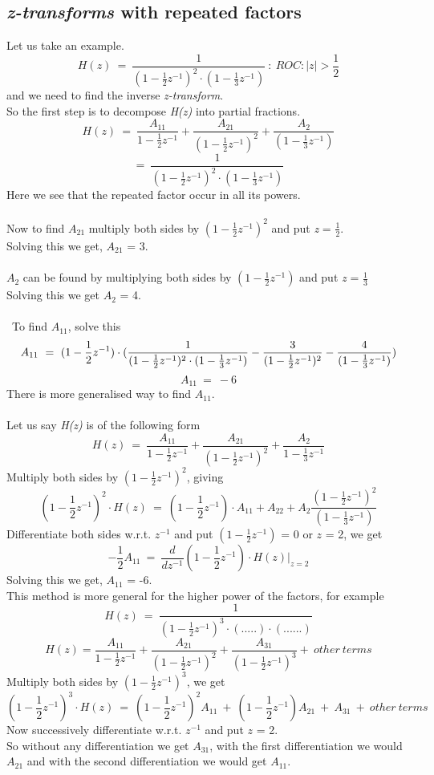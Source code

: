 \subsection{\textit{z-transforms} with repeated factors}
Let us take an example.
\[
H(z)\ =\ \frac{1}{(1 - \frac{1}{2}z^{-1})^2\cdot(1-\frac{1}{3}z^{-1})}\ :\ ROC: |z| > \frac{1}{2}
\]
and we need to find the inverse \textit{z-transform}.\\
So the first step is to decompose \textit{H(z)} into partial fractions.
\[
H(z)\ =\ \frac{A_{11}}{1 - \frac{1}{2}z^{-1}} + \frac{A_{21}}{(1 - \frac{1}{2}z^{-1})^2} + \frac{A_{2}}{(1 - \frac{1}{3}z^{-1})}
\]
\[
=\ \frac{1}{(1 - \frac{1}{2}z^{-1})^2\cdot(1-\frac{1}{3}z^{-1})}
\]
Here we see that the repeated factor occur in all its powers.\\\\
Now to find $A_{21}$ multiply both sides by $(1 - \frac{1}{2}z^{-1})^2$ and put \textit{z} = $\frac{1}{2}$.\\
Solving this we get, $A_{21}$ = 3.\\\\
$A_{2}$ can be found by multiplying both sides by $(1 - \frac{1}{2}z^{-1})$ and put \textit{z} = $\frac{1}{3}$\\
Solving this we get $A_{2}$ = 4.\\\\\
To find $A_{11}$, solve this\\
\[
A_{11}\ =\ (1 - \frac{1}{2}z^{-1})\cdot(\frac{1}{(1 - \frac{1}{2}z^{-1})^2\cdot(1-\frac{1}{3}z^{-1})} - \frac{3}{(1 - \frac{1}{2}z^{-1})^2} - \frac{4}{(1 - \frac{1}{3}z^{-1})})\\
\]
\[
A_{11}\ =\ -6
\]
There is more generalised way to find $A_{11}$.\\\\
Let us say \textit{H(z)} is of the following form
\[
H(z)\ =\ \frac{A_{11}}{1 - \frac{1}{2}z^{-1}} + \frac{A_{21}}{(1 - \frac{1}{2}z^{-1})^2} + \frac{A_{2}}{1 - \frac{1}{3}z^{-1}}
\]
Multiply both sides by $(1 - \frac{1}{2}z^{-1})^2$, giving
\[
(1 - \frac{1}{2}z^{-1})^2\cdot H(z)\ =\ (1 - \frac{1}{2}z^{-1})\cdot A_{11} + A_{22} + A_{2}\frac{(1 - \frac{1}{2}z^{-1})^2}{(1 - \frac{1}{3}z^{-1})}
\]
Differentiate both sides w.r.t. ${z}^{-1}$ and put $(1 - \frac{1}{2}z^{-1})$ = 0 or $z$ = 2, we get
\[
-\frac{1}{2}A_{11}\ =\ \frac{d}{dz^{-1}}(1 -\frac{1}{2}z^{-1})\cdot H(z) \bigg|_{z = 2}
\]
Solving this we get, $A_{11}$ = -6.\\
This method is more general for the higher power of the factors, for example
\[
H(z)\ =\ \frac{1}{(1 - \frac{1}{2}z^{-1})^3\cdot(.....)\cdot(......)}
\]
\[
H(z) = \frac{A_{11}}{1 - \frac{1}{2}z^{-1}} + \frac{A_{21}}{(1 - \frac{1}{2}z^{-1})^2} + \frac{A_{31}}{(1 - \frac{1}{2}z^{-1})^3} +\ other \ terms
\]
Multiply both sides by $(1 - \frac{1}{2}z^{-1})^3$, we get
\[
(1 - \frac{1}{2}z^{-1})^3\cdot H(z)\ =\ (1 - \frac{1}{2}z^{-1})^2A_{11}\ +\ (1 - \frac{1}{2}z^{-1})A_{21}\ +\ A_{31}\ +\ other\ terms   
\]
Now successively differentiate w.r.t. $z^{-1}$ and put $z$ = 2.\\
So without any differentiation we get $A_{31}$, with the first differentiation we would $A_{21}$ and with the second differentiation we would get $A_{11}$.
